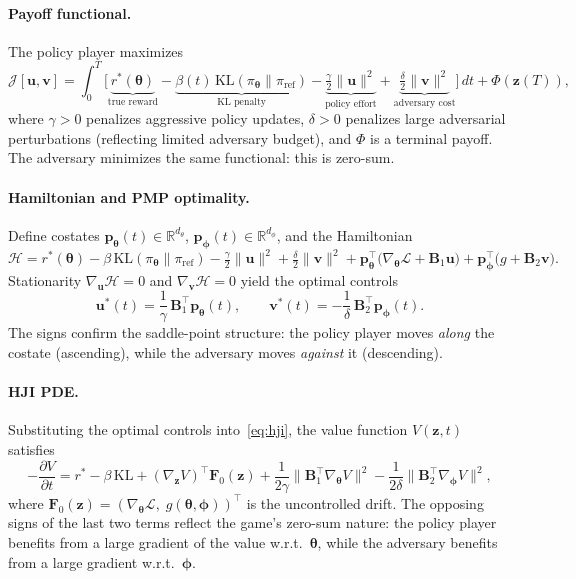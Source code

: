 \documentclass[10pt]{article}
\newcommand{\btheta}{\bm{\theta}}
\newcommand{\bphi}{\bm{\phi}}
\newcommand{\bz}{\bm{z}}
\newcommand{\bu}{\bm{u}}
\newcommand{\bv}{\bm{v}}
\newcommand{\bp}{\bm{p}}
\newcommand{\bB}{\bm{B}}
\newcommand{\bF}{\bm{F}}
\newcommand{\cH}{\mathcal{H}}
\newcommand{\cJ}{\mathcal{J}}
\newcommand{\cL}{\mathcal{L}}
\newcommand{\R}{\mathbb{R}}
\newcommand{\KL}{\mathrm{KL}}
\newcommand{\pder}[2]{\frac{\partial #1}{\partial #2}}
\begin{document}
\paragraph{Payoff functional.}
The policy player maximizes
\begin{equation}
  \cJ[\bu, \bv] = \int_0^T \bigl[\underbrace{r^*(\btheta)}_{\text{true reward}} - \underbrace{\beta(t)\,\KL(\pi_\btheta \| \pi_{\mathrm{ref}})}_{\text{KL penalty}} - \underbrace{\tfrac{\gamma}{2}\|\bu\|^2}_{\text{policy effort}} + \underbrace{\tfrac{\delta}{2}\|\bv\|^2}_{\text{adversary cost}}\bigr]\,dt + \Phi(\bz(T)),
  \label{eq:payoff_alignment}
\end{equation}
where $\gamma > 0$ penalizes aggressive policy updates, $\delta > 0$ penalizes large adversarial perturbations (reflecting limited adversary budget), and $\Phi$ is a terminal payoff.
The adversary minimizes the same functional: this is zero-sum.

\paragraph{Hamiltonian and PMP optimality.}
Define costates $\bp_\btheta(t) \in \R^{d_\theta}$, $\bp_\bphi(t) \in \R^{d_\phi}$, and the Hamiltonian
\begin{equation}
  \cH = r^*(\btheta) - \beta\,\KL(\pi_\btheta\|\pi_{\mathrm{ref}}) - \tfrac{\gamma}{2}\|\bu\|^2 + \tfrac{\delta}{2}\|\bv\|^2 + \bp_\btheta^\top\bigl(\nabla_\btheta \cL + \bB_1 \bu\bigr) + \bp_\bphi^\top\bigl(g + \bB_2 \bv\bigr).
  \label{eq:hamiltonian}
\end{equation}
Stationarity $\nabla_\bu \cH = 0$ and $\nabla_\bv \cH = 0$ yield the optimal controls
\begin{equation}
  \bu^*(t) = \frac{1}{\gamma}\,\bB_1^\top \bp_\btheta(t), \qquad
  \bv^*(t) = -\frac{1}{\delta}\,\bB_2^\top \bp_\bphi(t).
  \label{eq:optimal_controls}
\end{equation}
The signs confirm the saddle-point structure: the policy player moves \emph{along} the costate (ascending), while the adversary moves \emph{against} it (descending).

\paragraph{HJI PDE.}
Substituting the optimal controls into~\eqref{eq:hji}, the value function $V(\bz, t)$ satisfies
\begin{equation}
  -\pder{V}{t} = r^* - \beta\,\KL + (\nabla_\bz V)^\top \bF_0(\bz) + \frac{1}{2\gamma}\|\bB_1^\top \nabla_\btheta V\|^2 - \frac{1}{2\delta}\|\bB_2^\top \nabla_\bphi V\|^2,
  \label{eq:hji_alignment}
\end{equation}
where $\bF_0(\bz) = (\nabla_\btheta \cL,\; g(\btheta, \bphi))^\top$ is the uncontrolled drift.
The opposing signs of the last two terms reflect the game's zero-sum nature: the policy player benefits from a large gradient of the value w.r.t.\ $\btheta$, while the adversary benefits from a large gradient w.r.t.\ $\bphi$.
\end{document}
